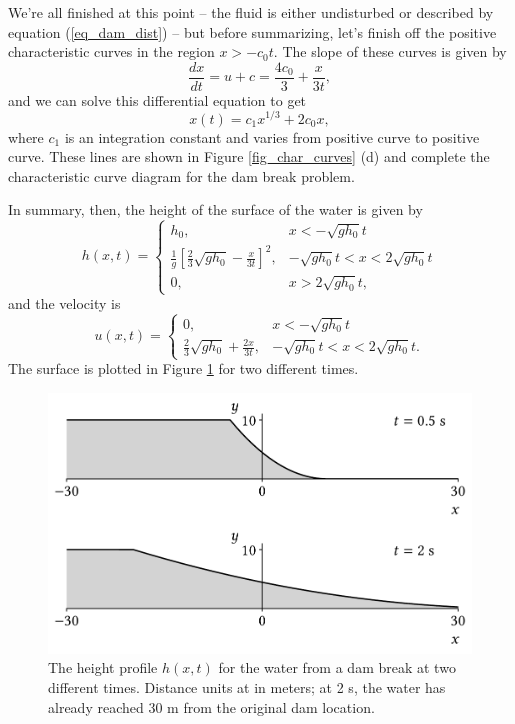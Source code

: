We're all finished at this point -- the fluid is either undisturbed or described by equation (\ref{eq_dam_dist}) -- but before summarizing, let's finish off the positive characteristic curves in the region $x>-c_0 t$.  The slope of these curves is given by
\[
\frac{dx}{dt} = u+c = \frac{4c_0}{3} + \frac{x}{3t},
\]
and we can solve this differential equation to get
\begin{equation}
x(t) = c_1 x^{1/3} + 2c_0 x,
\end{equation}
where $c_1$ is an integration constant and varies from positive curve to positive curve.  These lines are shown in Figure \ref{fig_char_curves} (d) and complete the characteristic curve diagram for the dam break problem.

In summary, then, the height of the surface of the water is given by
\begin{equation}
h(x, t) = \begin{cases}
h_0, & x < -\sqrt{gh_0} t \\
\frac{1}{g} \left[ \frac{2}{3} \sqrt{gh_0} - \frac{x}{3t} \right]^2, &  -\sqrt{gh_0} t < x < 2\sqrt{gh_0} t \\
0, & x > 2\sqrt{gh_0} t,
\end{cases}
\end{equation}
and the velocity is
\begin{equation}
u(x, t) = \begin{cases}
0, & x < -\sqrt{gh_0} t \\
\frac{2}{3} \sqrt{gh_0} + \frac{2x}{3t}, & -\sqrt{gh_0} t < x < 2\sqrt{gh_0} t.
\end{cases}
\end{equation}
The surface is plotted in Figure \ref{fig_dam_heights} for two different times.  

\begin{figure}
\centering
\includegraphics[width=0.85\linewidth]{Figures/Chapter6/fig_dam_heights}
\caption{The height profile $h(x, t)$ for the water from a dam break at two different times.  Distance units at in meters; at 2 s, the water has already reached 30 m from the original dam location.}
\label{fig_dam_heights}
\end{figure}

